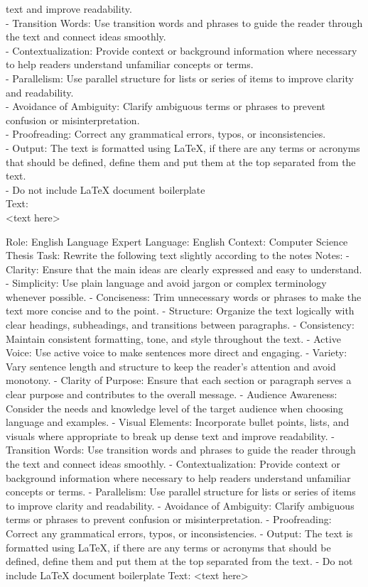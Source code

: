 text and improve readability. \\
- Transition Words: Use transition words and phrases to guide the reader through the text and connect ideas smoothly. \\
- Contextualization: Provide context or background information where necessary to help readers understand unfamiliar concepts or terms. \\
- Parallelism: Use parallel structure for lists or series of items to improve clarity and readability. \\
- Avoidance of Ambiguity: Clarify ambiguous terms or phrases to prevent confusion or misinterpretation. \\
- Proofreading: Correct any grammatical errors, typos, or inconsistencies. \\
- Output: The text is formatted using LaTeX, if there are any terms or acronyms that should be defined, define them and put them at the top separated from the text. \\
- Do not include LaTeX document boilerplate \\
Text: \\
<text here>

Role: English Language Expert
Language: English
Context: Computer Science Thesis
Task: Rewrite the following text slightly according to the notes
Notes:
- Clarity: Ensure that the main ideas are clearly expressed and easy to understand.
- Simplicity: Use plain language and avoid jargon or complex terminology whenever possible.
- Conciseness: Trim unnecessary words or phrases to make the text more concise and to the point.
- Structure: Organize the text logically with clear headings, subheadings, and transitions between paragraphs.
- Consistency: Maintain consistent formatting, tone, and style throughout the text.
- Active Voice: Use active voice to make sentences more direct and engaging.
- Variety: Vary sentence length and structure to keep the reader's attention and avoid monotony.
- Clarity of Purpose: Ensure that each section or paragraph serves a clear purpose and contributes to
the overall message.
- Audience Awareness: Consider the needs and knowledge level of the target audience when
choosing language and examples.
- Visual Elements: Incorporate bullet points, lists, and visuals where appropriate to break up dense
text and improve readability.
- Transition Words: Use transition words and phrases to guide the reader through the text and connect ideas smoothly.
- Contextualization: Provide context or background information where necessary to help readers understand unfamiliar concepts or terms.
- Parallelism: Use parallel structure for lists or series of items to improve clarity and readability.
- Avoidance of Ambiguity: Clarify ambiguous terms or phrases to prevent confusion or misinterpretation.
- Proofreading: Correct any grammatical errors, typos, or inconsistencies.
- Output: The text is formatted using LaTeX, if there are any terms or acronyms that should be defined, define them and put them at the top separated from the text.
- Do not include LaTeX document boilerplate
Text:
<text here>


